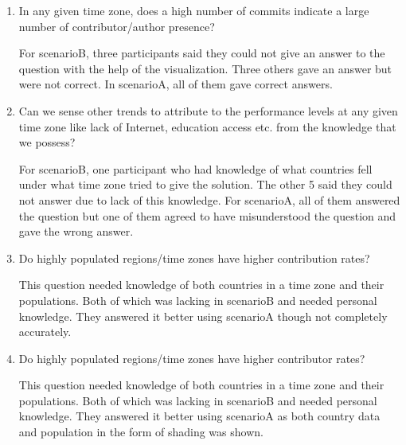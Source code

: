 \documentclass[seploa]{beavtex}
\begin{document}
\begin{enumerate}
\item In any given time zone, does a high number of commits indicate a large number of contributor/author presence?


For scenarioB, three participants said they could not give an answer to the question with the help of the visualization. Three others gave an answer but were not correct. In scenarioA, all of them gave correct answers.


\item Can we sense other trends to attribute to the performance levels at any given time zone like lack of Internet, education access etc. from the knowledge that we possess?


For scenarioB, one participant who had knowledge of what countries fell under what time zone tried to give the solution. The other 5 said they could not answer due to lack of this knowledge. For scenarioA, all of them answered the question but one of them agreed to have misunderstood the question and gave the wrong answer.


\item Do highly populated regions/time zones have higher contribution rates?


This question needed knowledge of both countries in a time zone and their populations. Both of which was lacking in scenarioB and needed personal knowledge. They answered it better using scenarioA though not completely accurately.

\item Do highly populated regions/time zones have higher contributor rates?


This question needed knowledge of both countries in a time zone and their populations. Both of which was lacking in scenarioB and needed personal knowledge. They answered it better using scenarioA as both country data and population in the form of shading was shown.


\end{enumerate}
\end{document}
